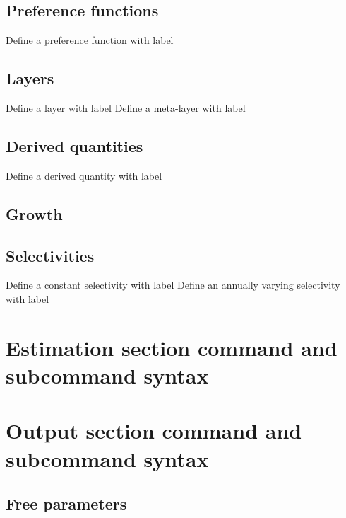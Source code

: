 \subsection*{Preference functions}
 {Define a preference function with label}
\subsection*{Layers}
 {Define a layer with label}
 {Define a meta-layer with label}
\subsection*{Derived quantities}
 {Define a derived quantity with label}
\subsection*{Growth}
\subsection*{Selectivities}
 {Define a constant selectivity with label}
 {Define an annually varying selectivity with label}
\section{Estimation section command and subcommand syntax}
\section{Output section command and subcommand syntax}
\subsection*{Free parameters}
